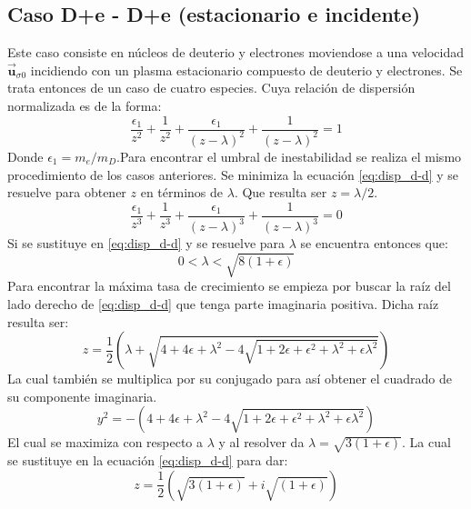 \documentclass[12pt]{article}
\begin{document}
\subsection*{Caso D+e - D+e (estacionario e incidente)}
Este caso consiste en núcleos de deuterio y electrones moviendose a una velocidad $\overrightarrow{\textbf{u}}_{\sigma 0}$ incidiendo con un plasma estacionario compuesto de deuterio y electrones. Se trata entonces de un caso de cuatro especies. Cuya relación de dispersión normalizada es de la forma:
\begin{equation}
\label{eq:disp_d-d}
\frac{\epsilon_1}{z^2}+\frac{1}{z^2}+\frac{\epsilon_1}{(z-\lambda)^2}+\frac{1}{(z-\lambda)^2}=1
\end{equation}
Donde $\epsilon_1 = m_e / m_D$.Para encontrar el umbral de inestabilidad se realiza el mismo procedimiento de los casos anteriores. Se minimiza la ecuación \ref{eq:disp_d-d} y se resuelve para obtener $z$ en términos de $\lambda$. Que resulta ser $z=\lambda /2$.
\begin{equation}
\frac{\epsilon_1}{z^3}+\frac{1}{z^3}+\frac{\epsilon_1}{(z-\lambda)^3}+\frac{1}{(z-\lambda)^3}=0
\end{equation}
Si se sustituye en \ref{eq:disp_d-d} y se resuelve para $\lambda$ se encuentra entonces que:
\begin{equation}
0 < \lambda < \sqrt{8(1+\epsilon)}
\end{equation}
Para encontrar la máxima tasa de crecimiento se empieza por buscar la raíz del lado derecho de \ref{eq:disp_d-d} que tenga parte imaginaria positiva. Dicha raíz resulta ser:
\begin{equation}
\label{eq:raiz_d-d}
z =\frac{1}{2}\left(\lambda + \sqrt{4 + 4\epsilon + \lambda ^2 -4\sqrt{1+2\epsilon + \epsilon^2+ \lambda^2 + \epsilon \lambda ^2}} \right)
\end{equation}
La cual también se multiplica por su conjugado para así obtener el cuadrado de su componente imaginaria.
\begin{equation}
y^2 = -\left(4 + 4\epsilon + \lambda ^2 -4\sqrt{1+2\epsilon + \epsilon^2+ \lambda^2 + \epsilon \lambda ^2}\right)
\end{equation}
El cual se maximiza con respecto a $\lambda$ y al resolver da $\lambda = \sqrt{3(1 + \epsilon)}$. La cual se sustituye en la ecuación \ref{eq:disp_d-d} para dar:
\begin{equation}
\label{eq:z-max-d-d}
z = \frac{1}{2}\left(\sqrt{3(1+\epsilon)} + i \sqrt{(1+\epsilon)} \right)
\end{equation}
\end{document}
